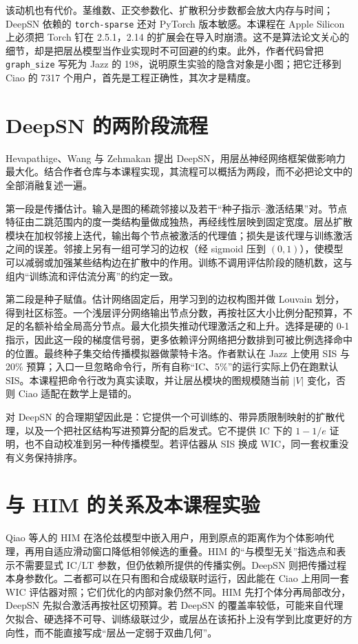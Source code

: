 \documentclass[a4paper,11pt,twocolumn]{ctexart}
\begin{document}
该动机也有代价。茎维数、正交参数化、扩散积分步数都会放大内存与时间；DeepSN 依赖的 \texttt{torch-sparse} 还对 PyTorch 版本敏感。本课程在 Apple Silicon 上必须把 Torch 钉在 2.5.1，2.14 的扩展会在导入时崩溃。这不是算法论文关心的细节，却是把层丛模型当作业实现时不可回避的约束。此外，作者代码曾把 \texttt{graph\_size} 写死为 Jazz 的 198，说明原生实验的隐含对象是小图；把它迁移到 Ciao 的 7317 个用户，首先是工程正确性，其次才是精度。

\section{DeepSN 的两阶段流程}

Hevapathige、Wang 与 Zehmakan 提出 DeepSN，用层丛神经网络框架做影响力最大化\cite{deepsn}。结合作者仓库与本课程实现，其流程可以概括为两段，而不必把论文中的全部消融复述一遍。

第一段是传播估计。输入是图的稀疏邻接以及若干“种子指示--激活结果”对。节点特征由二跳范围内的度一类结构量做成独热，再经线性层映到固定宽度。层丛扩散模块在加权邻接上迭代，输出每个节点被激活的代理值；损失是该代理与训练激活之间的误差。邻接上另有一组可学习的边权（经 sigmoid 压到 $(0,1)$），使模型可以减弱或加强某些结构边在扩散中的作用。训练不调用评估阶段的随机数，这与组内“训练流和评估流分离”的约定一致。

第二段是种子赋值。估计网络固定后，用学习到的边权构图并做 Louvain 划分，得到社区标签。一个浅层评分网络输出节点分数，再按社区大小比例分配预算，不足的名额补给全局高分节点。最大化损失推动代理激活之和上升。选择是硬的 0-1 指示，因此这一段的梯度信号弱，更多依赖评分网络把分数排到可被比例选择命中的位置。最终种子集交给传播模拟器做蒙特卡洛。作者默认在 Jazz 上使用 SIS 与 20\% 预算；入口一旦忽略命令行，所有自称“IC、5\%”的运行实际上仍在跑默认 SIS。本课程把命令行改为真实读取，并让层丛模块的图规模随当前 $|V|$ 变化，否则 Ciao 适配在数学上是错的。

对 DeepSN 的合理期望因此是：它提供一个可训练的、带异质限制映射的扩散代理，以及一个把社区结构写进预算分配的启发式。它不提供 IC 下的 $1-1/e$ 证明，也不自动校准到另一种传播模型。若评估器从 SIS 换成 WIC，同一套权重没有义务保持排序。

\section{与 HIM 的关系及本课程实验}

Qiao 等人的 HIM 在洛伦兹模型中嵌入用户，用到原点的距离作为个体影响代理，再用自适应滑动窗口降低相邻候选的重叠\cite{him}。HIM 的“与模型无关”指选点和表示不需要显式 IC/LT 参数，但仍依赖所提供的传播实例。DeepSN 则把传播过程本身参数化。二者都可以在只有图和合成级联时运行，因此能在 Ciao 上用同一套 WIC 评估器对照；它们优化的内部对象仍然不同。HIM 先打个体分再局部改分，DeepSN 先拟合激活再按社区切预算。若 DeepSN 的覆盖率较低，可能来自代理欠拟合、硬选择不可导、训练级联过少，或层丛在该拓扑上没有学到比度更好的方向性，而不能直接写成“层丛一定弱于双曲几何”。
\end{document}
